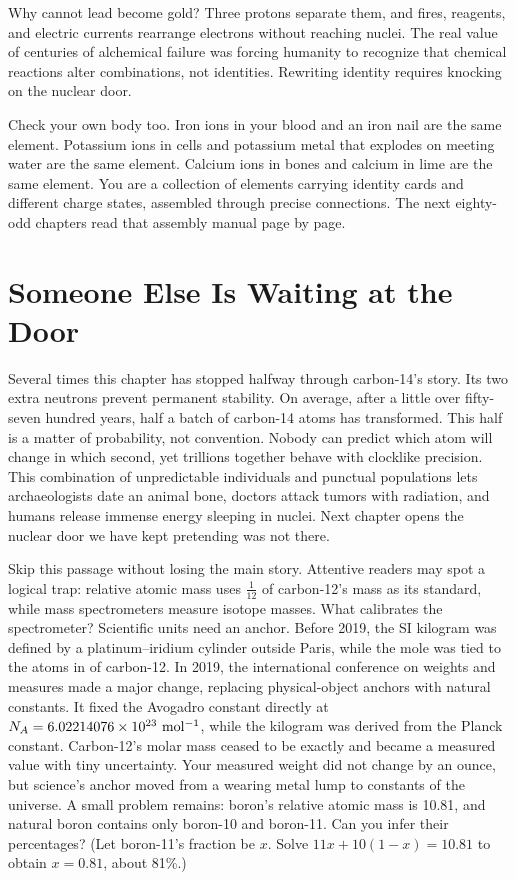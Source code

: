 Why cannot lead become gold? Three protons separate them, and fires, reagents, and electric currents rearrange electrons without reaching nuclei. The real value of centuries of alchemical failure was forcing humanity to recognize that chemical reactions alter combinations, not identities. Rewriting identity requires knocking on the nuclear door.

Check your own body too. Iron ions in your blood and an iron nail are the same element. Potassium ions in cells and potassium metal that explodes on meeting water are the same element. Calcium ions in bones and calcium in lime are the same element. You are a collection of elements carrying identity cards and different charge states, assembled through precise connections. The next eighty-odd chapters read that assembly manual page by page.

\section{Someone Else Is Waiting at the Door}

Several times this chapter has stopped halfway through carbon-14's story. Its two extra neutrons prevent permanent stability. On average, after a little over fifty-seven hundred years, half a batch of carbon-14 atoms has transformed. This half is a matter of probability, not convention. Nobody can predict which atom will change in which second, yet trillions together behave with clocklike precision. This combination of unpredictable individuals and punctual populations lets archaeologists date an animal bone, doctors attack tumors with radiation, and humans release immense energy sleeping in nuclei. Next chapter opens the nuclear door we have kept pretending was not there.

\begin{tiaozhan}
Skip this passage without losing the main story. Attentive readers may spot a logical trap: relative atomic mass uses $\frac{1}{12}$ of carbon-12's mass as its standard, while mass spectrometers measure isotope masses. What calibrates the spectrometer? Scientific units need an anchor. Before 2019, the SI kilogram was defined by a platinum--iridium cylinder outside Paris, while the mole was tied to the atoms in  of carbon-12. In 2019, the international conference on weights and measures made a major change, replacing physical-object anchors with natural constants. It fixed the Avogadro constant directly at $N_A = 6.02214076\times 10^{23}\ \mathrm{mol^{-1}}$, while the kilogram was derived from the Planck constant. Carbon-12's molar mass ceased to be exactly  and became a measured value with tiny uncertainty. Your measured weight did not change by an ounce, but science's anchor moved from a wearing metal lump to constants of the universe. A small problem remains: boron's relative atomic mass is 10.81, and natural boron contains only boron-10 and boron-11. Can you infer their percentages? (Let boron-11's fraction be $x$. Solve $11x+10(1-x)=10.81$ to obtain $x=0.81$, about 81\%.)
\end{tiaozhan}

